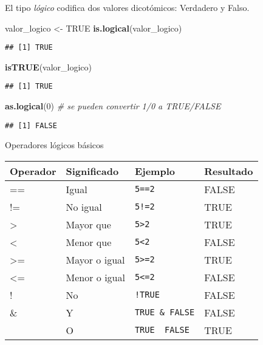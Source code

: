 \documentclass[
]{book}
\newenvironment{Shaded}{\begin{snugshade}}{\end{snugshade}}
\newcommand{\CommentTok}[1]{\textcolor[rgb]{0.56,0.35,0.01}{\textit{#1}}}
\newcommand{\DecValTok}[1]{\textcolor[rgb]{0.00,0.00,0.81}{#1}}
\newcommand{\KeywordTok}[1]{\textcolor[rgb]{0.13,0.29,0.53}{\textbf{#1}}}
\newcommand{\NormalTok}[1]{#1}
\newcommand{\OtherTok}[1]{\textcolor[rgb]{0.56,0.35,0.01}{#1}}
\newcommand{\StringTok}[1]{\textcolor[rgb]{0.31,0.60,0.02}{#1}}
\begin{document}
El tipo \emph{lógico} codifica dos valores dicotómicos: Verdadero y Falso.

\begin{Shaded}
\begin{Highlighting}[]
\NormalTok{valor_logico <-}\StringTok{ }\OtherTok{TRUE}
\KeywordTok{is.logical}\NormalTok{(valor_logico)}
\end{Highlighting}
\end{Shaded}

\begin{verbatim}
## [1] TRUE
\end{verbatim}

\begin{Shaded}
\begin{Highlighting}[]
\KeywordTok{isTRUE}\NormalTok{(valor_logico)}
\end{Highlighting}
\end{Shaded}

\begin{verbatim}
## [1] TRUE
\end{verbatim}

\begin{Shaded}
\begin{Highlighting}[]
\KeywordTok{as.logical}\NormalTok{(}\DecValTok{0}\NormalTok{) }\CommentTok{# se pueden convertir 1/0 a TRUE/FALSE}
\end{Highlighting}
\end{Shaded}

\begin{verbatim}
## [1] FALSE
\end{verbatim}

Operadores lógicos básicos

\begin{longtable}[]{@{}llll@{}}
\toprule
Operador & Significado & Ejemplo & Resultado\tabularnewline
\midrule
\endhead
== & Igual & \texttt{5==2} & FALSE\tabularnewline
!= & No igual & \texttt{5!=2} & TRUE\tabularnewline
\textgreater{} & Mayor que & \texttt{5\textgreater{}2} & TRUE\tabularnewline
\textless{} & Menor que & \texttt{5\textless{}2} & FALSE\tabularnewline
\textgreater= & Mayor o igual & \texttt{5\textgreater{}=2} & TRUE\tabularnewline
\textless= & Menor o igual & \texttt{5\textless{}=2} & FALSE\tabularnewline
! & No & \texttt{!TRUE} & FALSE\tabularnewline
\& & Y & \texttt{TRUE\ \&\ FALSE} & FALSE\tabularnewline
\textbar{} & O & \texttt{TRUE\ \textbar{}\ FALSE} & TRUE\tabularnewline
\bottomrule
\end{longtable}
\end{document}
